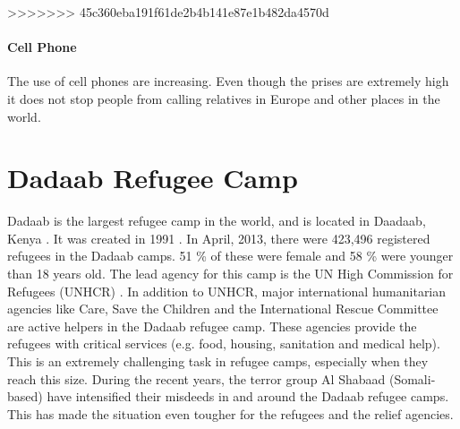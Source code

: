 >>>>>>> 45c360eba191f61de2b4b141e87e1b482da4570d

\paragraph{Cell Phone}
The use of cell phones are increasing. Even though the prises are extremely high it does not stop people from calling relatives in Europe and other places in the world. 
\cite{womenRefugee} 

\section{Dadaab Refugee Camp}
Dadaab is the largest refugee camp in the world, and is located in Daadaab, Kenya \cite{dadaab}. It was created in 1991 \cite{dadaabcare}. In April, 2013, there were 423,496 registered refugees in the Dadaab camps. 51 \% of these were female and 58 \% were younger than 18 years old. The lead agency for this camp is the UN High Commission for Refugees (UNHCR) \cite{dadaab}. In addition to UNHCR, major international humanitarian agencies like Care, Save the Children and the International Rescue Committee  are active helpers in the Dadaab refugee camp. These agencies provide the refugees with critical services (e.g. food, housing, sanitation and medical help). This is an extremely challenging task in refugee camps, especially when they reach this size. During the recent years, the terror group Al Shabaad (Somali-based) have intensified their misdeeds in and around the Dadaab refugee camps. This has made the situation even tougher for the refugees and the relief agencies. 

